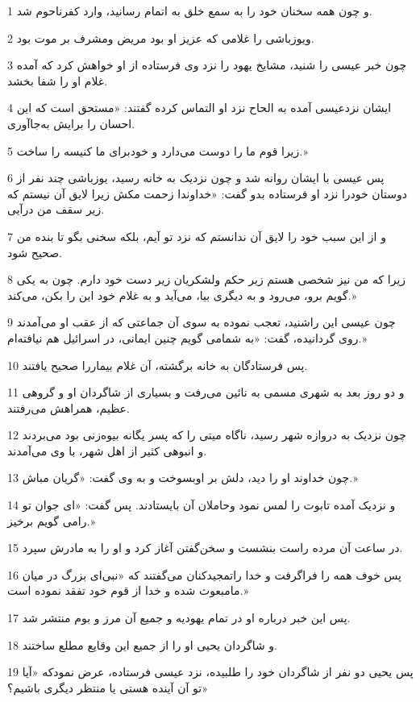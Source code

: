 \par 1 و چون همه سخنان خود را به سمع خلق به اتمام رسانید، وارد کفرناحوم شد.
\par 2 ویوزباشی را غلامی که عزیز او بود مریض ومشرف بر موت بود.
\par 3 چون خبر عیسی را شنید، مشایخ یهود را نزد وی فرستاده از او خواهش کرد که آمده غلام او را شفا بخشد.
\par 4 ایشان نزدعیسی آمده به الحاح نزد او التماس کرده گفتند: «مستحق است که این احسان را برایش به‌جاآوری.
\par 5 زیرا قوم ما را دوست می‌دارد و خودبرای ما کنیسه را ساخت.»
\par 6 پس عیسی با ایشان روانه شد و چون نزدیک به خانه رسید، یوزباشی چند نفر از دوستان خودرا نزد او فرستاده بدو گفت: «خداوندا زحمت مکش زیرا لایق آن نیستم که زیر سقف من درآیی.
\par 7 و از این سبب خود را لایق آن ندانستم که نزد تو آیم، بلکه سخنی بگو تا بنده من صحیح شود.
\par 8 زیرا که من نیز شخصی هستم زیر حکم ولشکریان زیر دست خود دارم. چون به یکی گویم برو، می‌رود و به دیگری بیا، می‌آید و به غلام خود این را بکن، می‌کند.»
\par 9 چون عیسی این راشنید، تعجب نموده به سوی آن جماعتی که از عقب او می‌آمدند روی گردانیده، گفت: «به شمامی گویم چنین ایمانی، در اسرائیل هم نیافته‌ام.»
\par 10 پس فرستادگان به خانه برگشته، آن غلام بیماررا صحیح یافتند.
\par 11 و دو روز بعد به شهری مسمی به نائین می‌رفت و بسیاری از شاگردان او و گروهی عظیم، همراهش می‌رفتند.
\par 12 چون نزدیک به دروازه شهر رسید، ناگاه میتی را که پسر یگانه بیوه‌زنی بود می‌بردند و انبوهی کثیر از اهل شهر، با وی می‌آمدند.
\par 13 چون خداوند او را دید، دلش بر اوبسوخت و به وی گفت: «گریان مباش.»
\par 14 و نزدیک آمده تابوت را لمس نمود وحاملان آن بایستادند. پس گفت: «ای جوان تو رامی گویم برخیز.»
\par 15 در ساعت آن مرده راست بنشست و سخن‌گفتن آغاز کرد و او را به مادرش سپرد.
\par 16 پس خوف همه را فراگرفت و خدا راتمجیدکنان می‌گفتند که «نبی‌ای بزرگ در میان مامبعوث شده و خدا از قوم خود تفقد نموده است.»
\par 17 پس این خبر درباره او در تمام یهودیه و جمیع آن مرز و بوم منتشر شد.
\par 18 و شاگردان یحیی او را از جمیع این وقایع مطلع ساختند.
\par 19 پس یحیی دو نفر از شاگردان خود را طلبیده، نزد عیسی فرستاده، عرض نمودکه «آیا تو آن آینده هستی یا منتظر دیگری باشیم؟»
